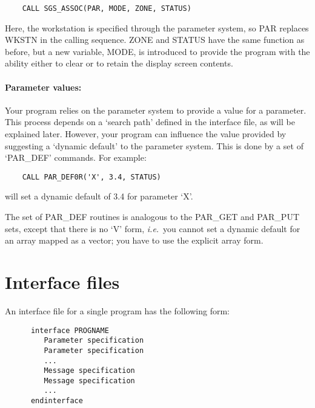 \begin{small}
\begin{verbatim}
    CALL SGS_ASSOC(PAR, MODE, ZONE, STATUS)
\end{verbatim}
\end{small}

Here, the workstation is specified through the parameter system, so PAR
replaces WKSTN in the calling sequence.
ZONE and STATUS have the same function as before, but a new variable, MODE, is
introduced to provide the program with the ability either to clear or to retain
the display screen contents.

\paragraph{Parameter values:}\hfill

Your program relies on the parameter system to provide a value for a parameter.
This process depends on a `search path' defined in the interface file, as
will be explained later.
However, your program can influence the value provided by suggesting a `dynamic
default' to the parameter system.
This is done by a set of `PAR\_DEF' commands.
For example:

\begin{small}
\begin{verbatim}
    CALL PAR_DEF0R('X', 3.4, STATUS)
\end{verbatim}
\end{small}

will set a dynamic default of 3.4 for parameter `X'.

The set of PAR\_DEF routines is analogous to the PAR\_GET and PAR\_PUT sets,
except that there is no `V' form, {\em i.e.}\, you cannot set a dynamic
default for an array mapped as a vector; you have to use the explicit array
form.

\section{Interface files}

An interface file for a single program has the following form:

\begin{small}
\begin{verbatim}
      interface PROGNAME
         Parameter specification
         Parameter specification
         ...
         Message specification
         Message specification
         ...
      endinterface
\end{verbatim}
\end{small}


